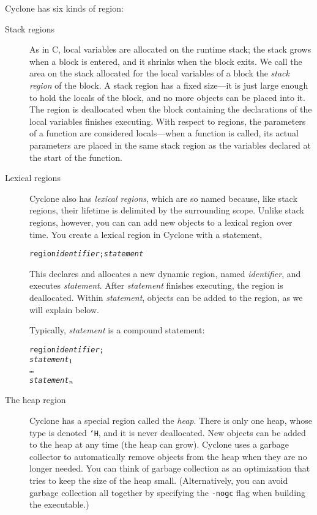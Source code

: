 Cyclone has six kinds of region:
\begin{description}
\item[Stack regions] As in C, local variables are allocated on the
  runtime stack; the stack grows when a block is entered, and it
  shrinks when the block exits.  We call the area on the stack
  allocated for the local variables of a block the \emph{stack region}
  of the block.  A stack region has a fixed size---it is just large
  enough to hold the locals of the block, and no more objects can be
  placed into it.  The region is deallocated when the block containing
  the declarations of the local variables finishes executing.  With
  respect to regions, the parameters of a function are considered
  locals---when a function is called, its actual parameters are placed
  in the same stack region as the variables declared at the start of
  the function.
  
\item[Lexical regions] Cyclone also has \emph{lexical regions}, which are so
  named because, like stack regions, their lifetime is delimited by the
  surrounding scope.  Unlike stack regions, however, you can can add new
  objects to a lexical region over time.  You create a lexical region in
  Cyclone with a statement,
\begin{alltt}
  region {\it identifier}; {\it statement}
\end{alltt}
  This declares and allocates a new dynamic region, named
  \textit{identifier}, and executes \textit{statement}.  After
  \textit{statement} finishes executing, the region is deallocated.
  Within \textit{statement}, objects can be added to the region, as we
  will explain below.

  Typically, \textit{statement} is a compound statement:
\begin{alltt}
  \lb region \textit{identifier};
    {\it statement}\(\sb{1}\)
    \ldots
    {\it statement}\(\sb{n}\)
  \rb
\end{alltt}

\item[The heap region] Cyclone has a special region called the
  \emph{heap}. There is only one heap, whose type is denoted \texttt{`H},
  and it is never deallocated.  New objects can be added to the heap at any
  time (the heap can grow).  Cyclone uses a garbage collector to
  automatically remove objects from the heap when they are no longer needed.
  You can think of garbage collection as an optimization that tries to keep
  the size of the heap small.  (Alternatively, you can avoid garbage
  collection all together by specifying the \texttt{-nogc} flag when
  building the executable.)


\end{description}
